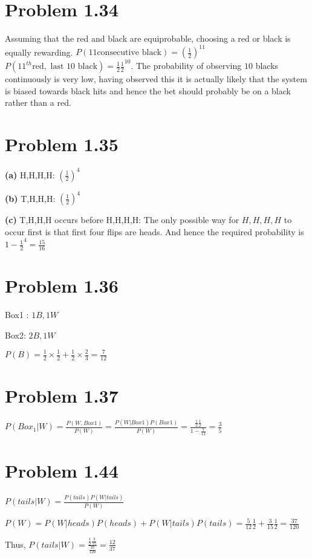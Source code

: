\documentclass[a4paper]{article}
\begin{document}
\section*{Problem 1.34}
Assuming that the red and black are equiprobable, choosing a red or black is equally rewarding.
$P(11 \text{consecutive black}) = (\frac{1}{2})^{11}$
$P(11^{th} \text{red} , \text{ last 10 black}) = \frac{1}{2}\frac{1}{2}^{10}$. The probability of observing $10$ blacks continuously is very low, having observed this it is actually likely that the system is biased towards black hits and hence the bet should probably be on a black rather than a red.

\section*{Problem 1.35}
\textbf{(a)} H,H,H,H: $(\frac{1}{2})^4$

\textbf{(b)} T,H,H,H: $(\frac{1}{2})^4$

\textbf{(c)} T,H,H,H occurs before H,H,H,H: The only possible way for $H,H,H,H$ to occur first is that first four flips are heads. And hence the required probability is $1-\frac{1}{2}^4 = \frac{15}{16}$

\section*{Problem 1.36}
Box1 : $1B, 1W$

Box2: $2B, 1W$

$P(B) = \frac{1}{2} \times \frac{1}{2} + \frac{1}{2} \times \frac{2}{3} = \frac{7}{12}$

\section*{Problem 1.37}

$P(Box_1|W) = \frac{P(W,Box1)}{P(W)} = \frac{P(W|Box1)P(Box1)}{P(W)} = \frac{\frac{1}{2}\frac{1}{2}}{1-\frac{7}{12}} = \frac{3}{5}$

\section*{Problem 1.44}
$P(tails|W) = \frac{P(tails)P(W|tails)}{P(W)}$

$P(W) = P(W|heads)P(heads) + P(W|tails)P(tails) = \frac{5}{12}\frac{1}{2} + \frac{3}{15}\frac{1}{2} = \frac{37}{120}$

Thus, $P(tails|W) = \frac{\frac{1}{2}\frac{3}{15}}{\frac{37}{120}} = \frac{12}{37}$
\end{document}
